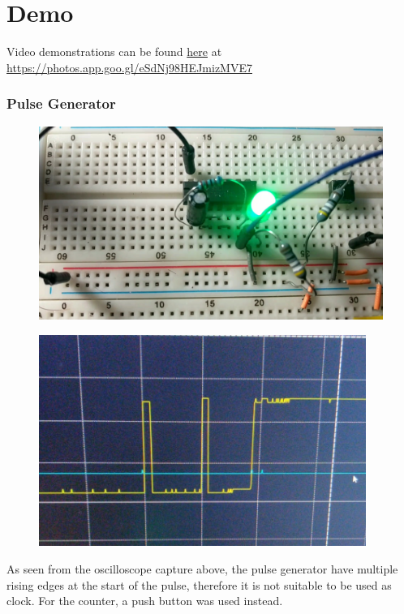 \documentclass{article}
\begin{document}
\newpage

\section*{Demo}
Video demonstrations can be found \href{https://photos.app.goo.gl/eSdNj98HEJmizMVE7}{here} at \url{https://photos.app.goo.gl/eSdNj98HEJmizMVE7}
\subsubsection*{Pulse Generator}
\begin{figure}[ht!]
  \centering
  \includegraphics[width=\textwidth]{ECE2300L_Lab12_Pulse.jpg}
\end{figure}
\begin{figure}[ht!]
  \centering
  \includegraphics[width=0.95\textwidth]{ECE2300L_Lab12_PulseStart.jpeg}
\end{figure}
As seen from the oscilloscope capture above, the pulse generator have multiple rising edges at the start of the pulse, therefore it is not suitable to be used as clock. For the counter, a push button was used instead.
\end{document}
